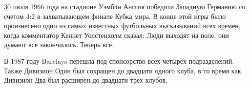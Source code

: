
30 июля 1966 года на стадионе Уэмбли Англия победила Западную Германию со счетом 4:2 в захватывающем финале Кубка мира. В конце этой игры было произнесено одно из самых известных футбольных высказываний всех времен, когда комментатор Кеннет Уолстенхолм сказал: Люди выходят на поле, они думают все закончилось. Теперь все.







В 1987 году Barclays перешла под спонсорство всех четырех подразделений. Также Дивизион Один был сокращен до двадцати одного клуба, в то время как Дивизион Два был расширен до двадцати трех клубов.

